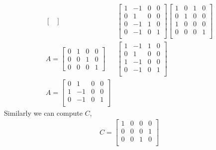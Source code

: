 \documentclass[12pt]{article}
\makeatletter
\theoremstyle{homework}
\newenvironment{exercise}[1]
{\def\@currentlabel{#1}\exercisecore}
{\endexercisecore}
\makeatother
\begin{document}
\begin{exercise}{4}
\begin{enumerate}
\begin{align*}
\begin{bmatrix}
            \end{bmatrix}
            &
            \begin{bmatrix}
                1 & -1 & 0 & 0\\
                0 & 1 & 0 & 0\\
                0 & -1 & 1 & 0\\
                0 & -1 & 0 & 1\\
            \end{bmatrix}
            \begin{bmatrix}
                1 & 0 & 1 & 0\\
                0 & 1 & 0 & 0\\
                1 & 0 & 0 & 0\\
                0 & 0 & 0 & 1\\
            \end{bmatrix}\\
            A = 
            \begin{bmatrix}
                0 & 1 & 0 & 0\\
                0 & 0 & 1 & 0\\
                0 & 0 & 0 & 1
            \end{bmatrix}
            &
            \begin{bmatrix}
                1 & -1 & 1 & 0\\
                0 & 1 & 0 & 0\\
                1 & -1 & 0 & 0\\
                0 & -1 & 0 & 1\\
            \end{bmatrix}\\
            A = 
            \begin{bmatrix}
                0 & 1 & 0 & 0\\
                1 & -1 & 0 & 0\\
                0 & -1 & 0 & 1\\
            \end{bmatrix}
        \end{align*}
        Similarly we can compute $C$, 
        \begin{align*}
            C = 
            \begin{bmatrix}
                1 & 0 & 0 & 0\\
                0 & 0 & 0 & 1\\
                0 & 0 & 1 & 0\\

\end{bmatrix}
\end{align*}
\end{enumerate}
\end{exercise}
\end{document}
